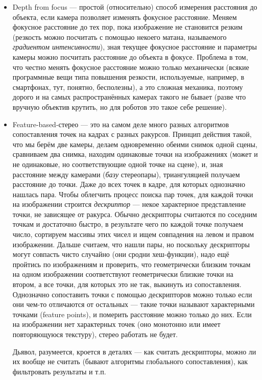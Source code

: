\documentclass{../../text-style}
\begin{document}
\begin{itemize}
    \item Depth from focus --- простой (относительно) способ измерения расстояния до объекта, если камера позволяет изменять фокусное расстояние.
        Меняем фокусное расстояние до тех пор, пока изображение не становится резким (резкость можно посчитать с помощью некоего матана, называемого \emph{градиентом интенсивности}), зная текущее фокусное расстояние и параметры камеры можно посчитать расстояние до объекта в фокусе.
        Проблема в том, что честно менять фокусное расстояние можно только механически (всякие программные вещи типа повышения резкости, используемые, например, в смартфонах, тут, понятно, бесполезны), а это сложная механика, поэтому дорого и на самых распространённых камерах такого не бывает (разве что вручную объектив крутить, но для роботов это такое себе решение).
    \item Feature-based-стерео --- это на самом деле много разных алгоритмов сопоставления точек на кадрах с разных ракурсов. Принцип действия такой, что мы берём две камеры, делаем одновременно обеими снимок одной сцены, сравниваем два снимка, находим одинаковые точки на изображениях (может и не одинаковые, но соответствующие одной точке на сцене), и, зная расстояние между камерами (\emph{базу} стереопары), триангуляцией получаем расстояние до точки.
        Даже до всех точек в кадре, для которых однозначно нашлась пара.
        Чтобы облегчить процесс поиска пар точек, для каждой точки на изображении строится \emph{дескриптор} --- некое характерное представление точки, не зависящее от ракурса.
        Обычно дескрипторы считаются по соседним точкам и достаточно быстро, в результате чего по каждой точке получаем число, сортируем массивы этих чисел и ищем совпадения на левом и правом изображении.
        Дальше считаем, что нашли пары, но поскольку дескрипторы могут совпасть чисто случайно (они сродни хеш-функции), надо ещё пройтись по изображениям и проверить, что геометрически близким точкам на одном изображении соответствуют геометрически близкие точки на втором, а все точки, для которых это не так, выкинуть из сопоставления.
        Однозначно сопоставить точки с помощью дескрипторов можно только если они чем-то отличаются от остальных --- такие точки называют характерными точками (feature points), и померить расстояние можно только до них.
        Если на изображении нет характерных точек (оно монотонно или имеет повторяющуюся текстуру), стерео работать не будет.

        Дьявол, разумеется, кроется в деталях --- как считать дескрипторы, можно ли их вообще не считать (бывают алгоритмы глобального сопоставления), как фильтровать результаты и т.п.


\end{itemize}
\end{document}
